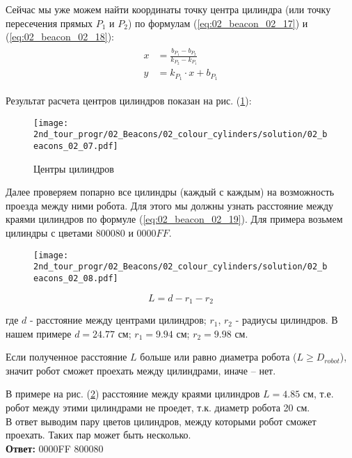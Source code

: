 Сейчас мы уже можем найти координаты точку центра цилиндра (или точку пересечения прямых $P_1$ и $P_2$) по формулам (\ref{eq:02_beacon_02_17}) и (\ref{eq:02_beacon_02_18}):
\begin{eqnarray}
\begin{aligned}
x &= \frac{b_{P_1} - b_{P_2}}{k_{P_2} - k_{P_1}}
\label{eq:02_beacon_02_17}\\
y &= k_{P_1} \cdot x + b_{P_1}
\label{eq:02_beacon_02_18}
\end{aligned}
\end{eqnarray}

Результат расчета центров цилиндров показан на рис. (\ref{fig:02_beacons_02_07}):
\begin{figure}[h!]
	\centering
	\texttt{[image: 2nd\_tour\_progr/02\_Beacons/02\_colour\_cylinders/solution/02\_beacons\_02\_07.pdf]}
	\caption{Центры цилиндров}
	\label{fig:02_beacons_02_07}
\end{figure}

Далее проверяем попарно все цилиндры (каждый с каждым) на возможность проезда между ними робота. Для этого мы должны узнать расстояние между краями цилиндров по формуле (\ref{eq:02_beacon_02_19}). Для примера возьмем цилиндры с цветами $800080$ и $0000FF$.

\begin{figure}[h!]
	\centering
	\texttt{[image: 2nd\_tour\_progr/02\_Beacons/02\_colour\_cylinders/solution/02\_beacons\_02\_08.pdf]}
	\caption{}
	\label{fig:02_beacons_02_08}
\end{figure}

\begin{equation}
L = d - r_1 - r_2
\label{eq:02_beacon_02_19}
\end{equation}

где $d$ - расстояние между центрами цилиндров; $r_1$, $r_2$ - радиусы цилиндров. 
В нашем примере $d = 24.77 \text{ см}$; $r_1=9.94 \text{ см}$; $r_2=9.98 \text{ см}$.

Если полученное расстояние $L$ больше или равно диаметра робота ($L \geq D_{robot}$), значит робот сможет проехать между цилиндрами, иначе – нет.

В примере на рис. (\ref{fig:02_beacons_02_08}) расстояние между краями цилиндров $L=4.85$ см, т.е. робот между этими цилиндрами не проедет, т.к. диаметр робота 20 см.
\\

В ответ выводим пару цветов цилиндров, между которыми робот сможет проехать. Таких пар может быть несколько.
\\

\textbf{Ответ: } 0000FF 800080


\codeExample

